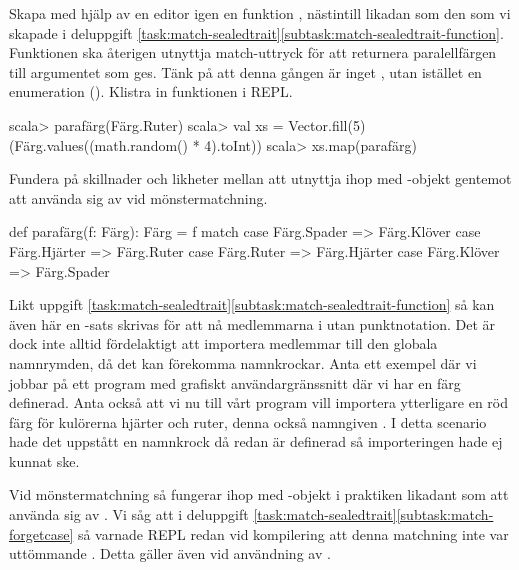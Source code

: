 \Subtask Skapa med hjälp av en editor igen en funktion , nästintill likadan som den som vi skapade i deluppgift \ref{task:match-sealedtrait}\ref{subtask:match-sealedtrait-function}. Funktionen ska återigen utnyttja match-uttryck för att returnera paralellfärgen till argumentet som ges. Tänk på att denna gången är  inget , utan istället en enumeration (). Klistra in funktionen i REPL.
\begin{REPL}
scala> parafärg(Färg.Ruter)
scala> val xs = Vector.fill(5)(Färg.values((math.random() * 4).toInt))
scala> xs.map(parafärg)
\end{REPL}


\Subtask
Fundera på skillnader och likheter mellan att utnyttja  ihop med -objekt gentemot att använda sig av  vid mönstermatchning.


\SOLUTION


\TaskSolved \what
\SubtaskSolved
\begin{Code}
def parafärg(f: Färg): Färg = f match
  case Färg.Spader  => Färg.Klöver
  case Färg.Hjärter => Färg.Ruter
  case Färg.Ruter   => Färg.Hjärter
  case Färg.Klöver  => Färg.Spader
\end{Code}
Likt uppgift \ref{task:match-sealedtrait}\ref{subtask:match-sealedtrait-function} så kan även här en -sats skrivas för att nå medlemmarna i  utan punktnotation.
Det är dock inte alltid fördelaktigt att importera medlemmar till den globala namnrymden, då det kan förekomma namnkrockar. Anta ett exempel där vi jobbar på ett program med grafiskt användargränssnitt där vi har en färg  definerad.
Anta också att vi nu till vårt program vill importera ytterligare en röd färg för kulörerna hjärter och ruter, denna också namngiven . I detta scenario hade det uppstått en namnkrock då  redan är definerad så importeringen hade ej kunnat ske.

\SubtaskSolved
Vid mönstermatchning så fungerar  ihop med -objekt i praktiken likadant som att använda sig av .
Vi såg att i deluppgift \ref{task:match-sealedtrait}\ref{subtask:match-forgetcase} så varnade REPL redan vid kompilering att denna matchning inte var uttömmande . Detta gäller även vid användning av .

\QUESTEND




